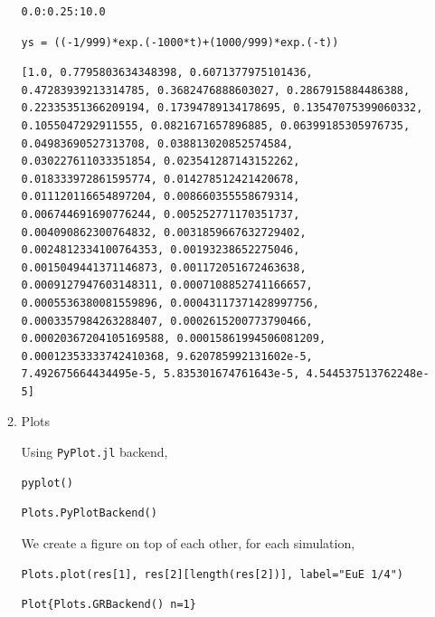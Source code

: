 \documentclass[11pt]{article}
\begin{document}
\begin{enumerate}
\begin{enumerate}
\begin{verbatim}
0.0:0.25:10.0
\end{verbatim}


\begin{verbatim}
ys = ((-1/999)*exp.(-1000*t)+(1000/999)*exp.(-t))
\end{verbatim}

\begin{verbatim}
[1.0, 0.7795803634348398, 0.6071377975101436, 0.47283939213314785, 0.3682476888603027, 0.2867915884486388, 0.22335351366209194, 0.17394789134178695, 0.13547075399060332, 0.1055047292911555, 0.0821671657896885, 0.06399185305976735, 0.04983690527313708, 0.038813020852574584, 0.030227611033351854, 0.023541287143152262, 0.018333972861595774, 0.014278512421420678, 0.011120116654897204, 0.008660355558679314, 0.006744691690776244, 0.005252771170351737, 0.004090862300764832, 0.0031859667632729402, 0.0024812334100764353, 0.00193238652275046, 0.0015049441371146873, 0.001172051672463638, 0.0009127947603148311, 0.0007108852741166657, 0.0005536380081559896, 0.00043117371428997756, 0.0003357984263288407, 0.0002615200773790466, 0.00020367204105169588, 0.00015861994506081209, 0.00012353333742410368, 9.620785992131602e-5, 7.492675664434495e-5, 5.835301674761643e-5, 4.544537513762248e-5]
\end{verbatim}

\item Plots
\label{sec:org413a75b}

Using \texttt{PyPlot.jl} backend,
\begin{verbatim}
pyplot()
\end{verbatim}

\begin{verbatim}
Plots.PyPlotBackend()
\end{verbatim}



We create a figure on top of each other, for each simulation,
\begin{verbatim}
Plots.plot(res[1], res[2][length(res[2])], label="EuE 1/4")
\end{verbatim}

\begin{verbatim}
Plot{Plots.GRBackend() n=1}
\end{verbatim}



\end{enumerate}
\end{enumerate}
\end{document}
